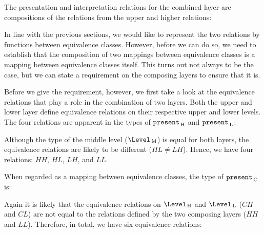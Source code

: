


The presentation and interpretation relations for the combined layer are compositions of the relations from the upper and higher relations: %

\xpr{
\Present\C = \Present\L \oo \Present\H\\
\Interpret\C = \Interpret\H \oo\Interpret\L\\
}

In line with the previous sections, we would like to represent the two relations by functions between equivalence classes. However, before we can do so, we need to establish that the composition of two mappings between equivalence classes is a mapping between equivalence classes itself. This turns out not always to be the case, but we can state a requirement on the composing layers to ensure that it is.

Before we give the requirement, however, we first take a look at the equivalence relations that play a role in the combination of two layers. Both the upper and lower layer 
define equivalence relations on their respective upper and lower levels. The four relations are apparent in the types of ${\tt present}_{\, \mathrm H}$ and ${\tt present}_{\, \mathrm L}$:


Although the type of the middle level ($\Level\M$) is equal for both layers, the equivalence relations are likely to be different ($HL \neq LH$). Hence, we have four relations: $HH$, $HL$, $LH$, and $LL$.

When regarded as a mapping between equivalence classes, the type of ${\tt present}_{\, \mathrm C}$ is:


Again it is likely that the equivalence relations on $\Level\H$ and $\Level\L$ ($CH$ and $CL$) are not equal to the relations defined by the two composing layers ($HH$ and $LL$). Therefore, in total, we have six equivalence relations:

